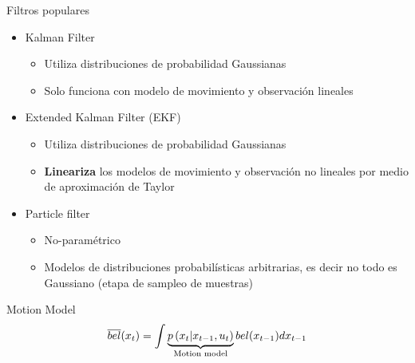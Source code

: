 \begin{frame}{Filtros populares}
    \begin{itemize}
        \item Kalman Filter
        \begin{itemize}
            \item Utiliza distribuciones de probabilidad Gaussianas
            \item Solo funciona con modelo de movimiento y observación lineales
        \end{itemize}
        \item Extended Kalman Filter (EKF)
        \begin{itemize}
            \item Utiliza distribuciones de probabilidad Gaussianas
            \item {\bf Lineariza} los modelos de movimiento y observación no lineales por medio de aproximación de Taylor
        \end{itemize}
        \item Particle filter
        \begin{itemize}
            \item No-paramétrico 
            \item Modelos de distribuciones probabilísticas arbitrarias, es decir no todo es Gaussiano (etapa de sampleo de muestras)
        \end{itemize}
    \end{itemize}

\end{frame}

\begin{frame}{Motion Model}
    \begin{equation*}
        \overline{bel}(x_{t}) = \int \underbrace{p\left(x_{t} | x_{t-1}, u_{t} \right)}_{\text{Motion model}} bel(x_{t-1}) d x_{t-1}
    \end{equation*}
\end{frame}

